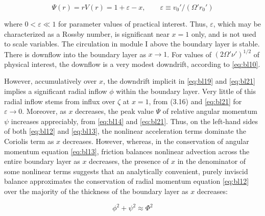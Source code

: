 \documentclass[preprint, prX]{revtex4}
\begin{document}
\begin{equation}
\Psi(r) = rV(r) = 1 + \varepsilon -x, \qquad \varepsilon \equiv v_0'/(\Omega' r_0')
\label{eq:bl21}
\end{equation}

where $0 < \varepsilon \ll 1$ for parameter values of practical interest. Thus, $\varepsilon$, which may be characterized as a Rossby number, is significant near $x = 1$ only, and is not used to scale variables. The circulation in module I above the boundary layer is stable. There is downflow into the boundary layer as $x \rightarrow 1$. For values of $(2\Omega' \nu')^{1/2}$ of physical interest, the downflow is a very modest downdrift, according to \eqref{eq:bl10}.

However, accumulatively over $x$, the downdrift implicit in \eqref{eq:bl19} and \eqref{eq:bl21} implies a significant radial inflow $\phi$ within the boundary layer. Very little of this radial inflow stems from influx over $\zeta$ at $x = 1$, from (3.16) and \eqref{eq:bl21} for $\varepsilon \rightarrow 0$. Moreover, as $x$ decreases, the peak value $\Psi$ of relative angular momentum $\psi$ increases appreciably, from \eqref{eq:bl14} and \eqref{eq:bl21}. Thus, on the left-hand sides of both \eqref{eq:bl12} and \eqref{eq:bl13}, the nonlinear acceleration terms dominate the Coriolis term as $x$ decreases. However, whereas, in the conservation of angular momentum equation \eqref{eq:bl13}, friction balances nonlinear advection across the entire boundary layer as $x$ decreases, the presence of $x$ in the denominator of some nonlinear terms suggests that an analytically convenient, purely inviscid balance approximates the conservation of radial momentum equation \eqref{eq:bl12} over the majority of the thickness of the boundary layer as $x$ decreases:

\begin{equation}
\phi^2 + \psi^2 \approx \Phi^2
\label{eq:blinvapprox}
\end{equation}
\end{document}
